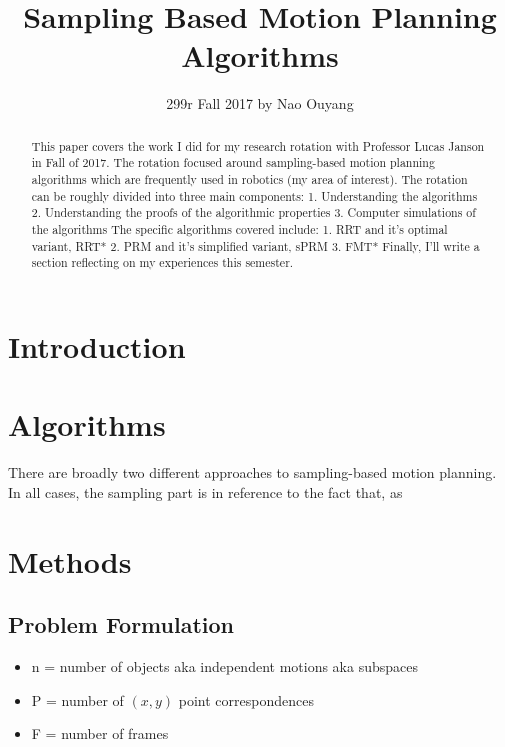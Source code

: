 \documentclass[a4paper]{article}
\title{Sampling Based Motion Planning Algorithms}
\author{299r Fall 2017 by Nao Ouyang}
\begin{document}
\maketitle

\begin{abstract} 
This paper covers the work I did for my research rotation with Professor Lucas Janson in Fall of 2017. The rotation focused around sampling-based
motion planning algorithms which are frequently used in robotics (my area of interest).  The rotation can be roughly divided into three main
components: 1. Understanding the algorithms 2. Understanding the proofs of the algorithmic properties 3. Computer simulations of the algorithms
The specific algorithms covered include: 1. RRT and it's optimal variant, RRT* 2. PRM and it's simplified variant, sPRM 3. FMT* Finally, I'll write a section reflecting on my experiences this semester.

\end{abstract}

\section{Introduction}


\section{Algorithms}

There are broadly two different approaches to sampling-based motion planning. In all cases, the sampling part is in reference to the fact that, as




\section{Methods}


\subsection{Problem Formulation}

\newcommand{\matx}[1]{\mbox{\tt #1}} \newcommand{\vect}[1]{{\bf #1}}

\begin{itemize} \item n = number of objects aka independent motions aka subspaces \item P = number of $(x, y)$ point correspondences \item F = number
of frames \end{itemize}
\end{document}
